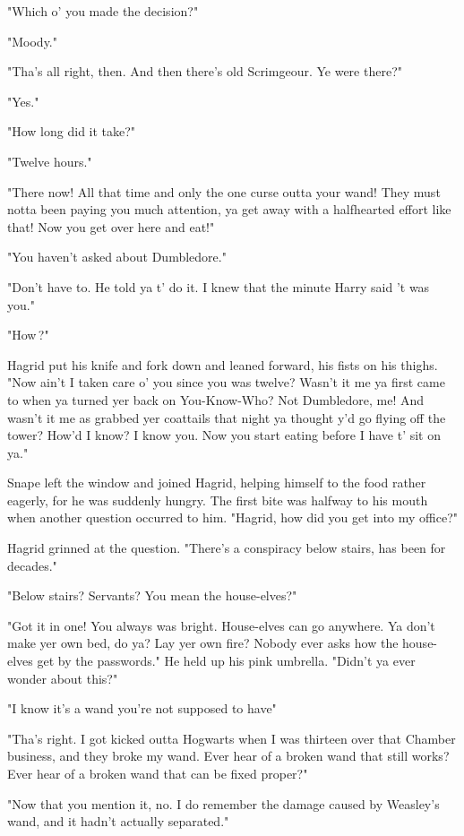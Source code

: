 "Which o' you made the decision?"

"Moody."

"Tha's all right, then. And then there's old Scrimgeour. Ye were there?"

"Yes."

"How long did it take?"

"Twelve hours."

"There now! All that time and only the one curse outta your wand! They must notta been paying you much attention, ya get away with a halfhearted effort like that! Now you get over here and eat!"

"You haven't asked about Dumbledore."

"Don't have to. He told ya t' do it. I knew that the minute Harry said 't was you."

"How{\el}\,?"

Hagrid put his knife and fork down and leaned forward, his fists on his thighs. "Now ain't I taken care o' you since you was twelve? Wasn't it me ya first came to when ya turned yer back on You-Know-Who? Not Dumbledore, me! And wasn't it me as grabbed yer coattails that night ya thought y'd go flying off the tower? How'd I know? I know you. Now you start eating before I have t' sit on ya."

Snape left the window and joined Hagrid, helping himself to the food rather eagerly, for he was suddenly hungry. The first bite was halfway to his mouth when another question occurred to him. "Hagrid, how did you get into my office?"

Hagrid grinned at the question. "There's a conspiracy below stairs, has been for decades."

"Below stairs? Servants? You mean the house-elves?"

"Got it in one! You always was bright. House-elves can go anywhere. Ya don't make yer own bed, do ya? Lay yer own fire? Nobody ever asks how the house-elves get by the passwords." He held up his pink umbrella. "Didn't ya ever wonder about this?"

"I know it's a wand you're not supposed to have{\el}"

"Tha's right. I got kicked outta Hogwarts when I was thirteen over that Chamber business, and they broke my wand. Ever hear of a broken wand that still works? Ever hear of a broken wand that can be fixed proper?"

"Now that you mention it, no. I do remember the damage caused by Weasley's wand, and it hadn't actually separated."

